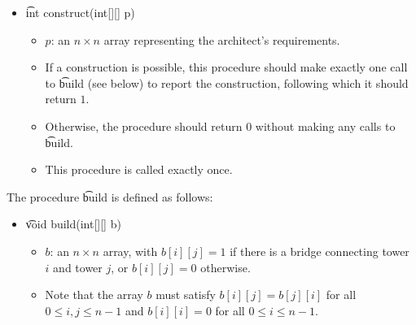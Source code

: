 \begin{itemize}
\item \t{int construct(int[][] p)}
\begin{itemize}
\item $p$: an $n \times n$ array representing the architect's requirements.
\item If a construction is possible, this procedure should make exactly one call to \t{build} (see below) to report the construction, following which it should return $1$.
\item Otherwise, the procedure should return $0$ without making any calls to \t{build}.
\item This procedure is called exactly once.
\end{itemize}
\end{itemize}
The procedure \t{build} is defined as follows:
\begin{itemize}
\item \t{void build(int[][] b)}
\begin{itemize}
\item $b$: an $n \times n$ array, with $b[i][j]=1$ if there is a bridge connecting tower $i$ and tower $j$, or $b[i][j]=0$ otherwise.
\item Note that the array $b$ must satisfy $b[i][j]=b[j][i]$ for all $0 \leq i,j \leq n-1$ and $b[i][i] = 0$ for all $0 \leq i \leq n-1$.
\end{itemize}
\end{itemize}


